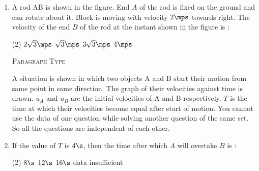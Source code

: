 \documentclass{article}
\renewcommand{\ans}{\quad}
\begin{document}
\begin{enumerate}
\item A rod AB is shown in the figure. End $A$ of the rod is fixed on the ground and can rotate about it. Block is moving with velocity $2\mps$ towards right. The velocity of the end $B$ of the rod at the instant shown in the figure is :
    \begin{center}
    \end{center}
    \begin{tasks}(2)
        \task $2\sqrt{3}\mps$
        \task $\sqrt{3}\mps$
        \task $3\sqrt{3}\mps$
        \task $4\mps$\ans
    \end{tasks}

    \begin{center}
        \textsc{Paragraph Type}
    \end{center}
    A situation is shown in which two objects A and B start their motion from same point in same direction. The graph of their velocities against time is drawn. $u_A$ and $u_B$ are the initial velocities of A and B respectively. $T$ is the time at which their velocities become equal after start of motion. You cannot use the data of one question while solving another question of the same set. So all the questions are independent of each other.
    \begin{center}
    \end{center}
    \item If the value of $T$ is $4\s$, then the time after which $A$ will overtake $B$ is :
    \begin{tasks}(2)
        \task $8\s$\ans
        \task $12\s$
        \task $16\s$
        \task data insufficient
    \end{tasks}


\end{enumerate}
\end{document}
